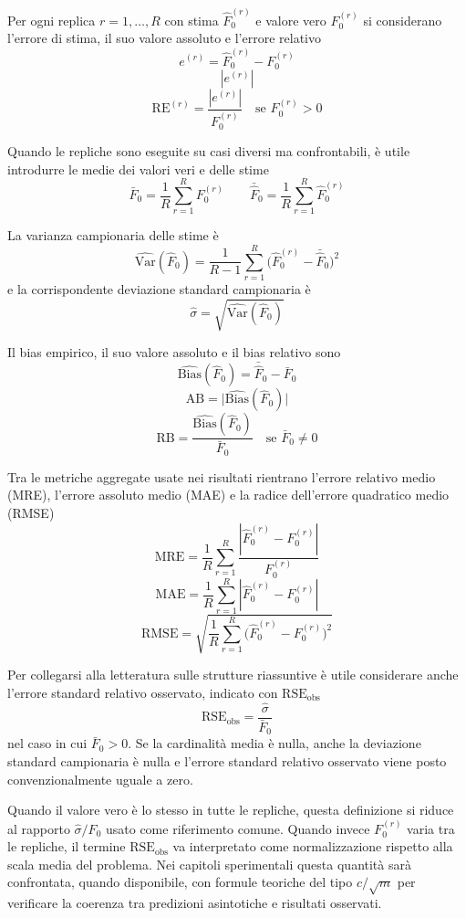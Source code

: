 Per ogni replica $r = 1,\dots,R$ con stima $\hat{F}_0^{(r)}$ e valore vero $F_0^{(r)}$
si considerano l'errore di stima, il suo valore assoluto e l'errore relativo
\[
e^{(r)} = \hat{F}_0^{(r)} - F_0^{(r)}
\]
\[
|e^{(r)}|
\]
\[
\mathrm{RE}^{(r)} =
\frac{|e^{(r)}|}{F_0^{(r)}}
\quad \text{se } F_0^{(r)} > 0
\]

Quando le repliche sono eseguite su casi diversi ma confrontabili, è utile introdurre
le medie dei valori veri e delle stime
\[
\bar{F}_0 = \frac{1}{R}\sum_{r=1}^{R} F_0^{(r)}
\qquad
\bar{\hat{F}}_0 = \frac{1}{R}\sum_{r=1}^{R} \hat{F}_0^{(r)}
\]

La varianza campionaria delle stime è
\[
\widehat{\mathrm{Var}}(\hat{F}_0) =
\frac{1}{R-1}\sum_{r=1}^{R}
\bigl(\hat{F}_0^{(r)}-\bar{\hat{F}}_0\bigr)^2
\]
e la corrispondente deviazione standard campionaria è
\[
\widehat{\sigma} =
\sqrt{\widehat{\mathrm{Var}}(\hat{F}_0)}
\]

Il bias empirico, il suo valore assoluto e il bias relativo sono
\[
\widehat{\mathrm{Bias}}(\hat{F}_0) =
\bar{\hat{F}}_0 - \bar{F}_0
\]
\[
\mathrm{AB} =
\bigl|\widehat{\mathrm{Bias}}(\hat{F}_0)\bigr|
\]
\[
\mathrm{RB} =
\frac{\widehat{\mathrm{Bias}}(\hat{F}_0)}{\bar{F}_0}
\quad \text{se } \bar{F}_0 \neq 0
\]

Tra le metriche aggregate usate nei risultati rientrano l'errore relativo medio (MRE),
l'errore assoluto medio (MAE) e la radice dell'errore quadratico medio (RMSE)
\[
\mathrm{MRE} =
\frac{1}{R}\sum_{r=1}^{R}
\frac{|\hat{F}_0^{(r)}-F_0^{(r)}|}{F_0^{(r)}}
\]
\[
\mathrm{MAE} =
\frac{1}{R}\sum_{r=1}^{R}
|\hat{F}_0^{(r)}-F_0^{(r)}|
\]
\[
\mathrm{RMSE} =
\sqrt{
\frac{1}{R}\sum_{r=1}^{R}
\bigl(\hat{F}_0^{(r)}-F_0^{(r)}\bigr)^2
}
\]

Per collegarsi alla letteratura sulle strutture riassuntive è utile considerare anche l'errore standard relativo osservato,
indicato con $\mathrm{RSE}_{\text{obs}}$
\[
\mathrm{RSE}_{\text{obs}} =
\frac{\widehat{\sigma}}{\bar{F}_0}
\]
nel caso in cui $\bar{F}_0 > 0$. Se la cardinalità media è nulla, anche la deviazione standard campionaria è nulla
e l'errore standard relativo osservato viene posto convenzionalmente uguale a zero.

Quando il valore vero è lo stesso in tutte le repliche, questa definizione si riduce al rapporto $\widehat{\sigma}/F_0$
usato come riferimento comune.
Quando invece $F_0^{(r)}$ varia tra le repliche, il termine $\mathrm{RSE}_{\text{obs}}$ va interpretato
come normalizzazione rispetto alla scala media del problema. Nei capitoli sperimentali questa quantità sarà confrontata,
quando disponibile, con formule teoriche del tipo $c/\sqrt{m}$ per verificare la coerenza
tra predizioni asintotiche e risultati osservati.
